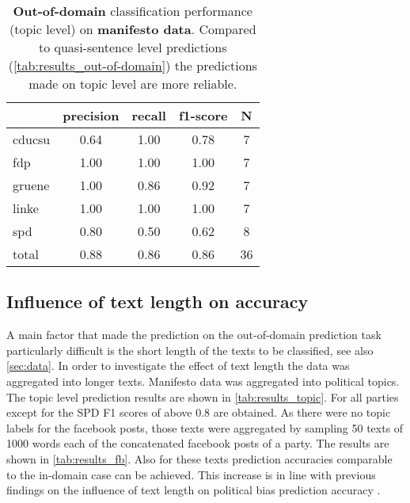 \documentclass[11pt]{article}
\begin{document}
\begin{table}[t]
\caption{
\label{tab:results_topic}
{\bf Out-of-domain} classification performance (topic level) on {\bf manifesto data}. Compared to quasi-sentence level predictions (\autoref{tab:results_out-of-domain}) the predictions made on topic level are more reliable.}
\begin{center}
\begin{tabular}{lcccc}
    &         precision    &recall &  f1-score  & N  \\
    \hline
        \hline
cducsu     &  0.64  &    1.00  &    0.78    &     7\\
       fdp    &   1.00    &  1.00    &  1.00    &     7\\
    gruene  &     1.00  &    0.86  &    0.92    &     7\\
     linke    &   1.00   &   1.00     & 1.00    &     7\\
       spd   &    0.80   &   0.50    &  0.62     &    8\\
    \hline
total  &     0.88   &   0.86   &   0.86  &      36\\
\end{tabular}
\end{center}
\end{table}


\subsection{Influence of text length on accuracy}
A main factor that made the prediction on the out-of-domain prediction task particularly difficult is the short length of the texts to be classified, see also \autoref{sec:data}. In order to investigate the effect of text length the data was aggregated into longer texts. Manifesto data was aggregated into political topics. The topic level prediction results are shown in \autoref{tab:results_topic}. For all parties except for the SPD F1 scores of above 0.8 are obtained. As there were no topic labels for the facebook posts, those texts were aggregated by sampling 50 texts of 1000 words each of the concatenated facebook posts of a party. The results are shown in \autoref{tab:results_fb}. Also for these texts prediction accuracies comparable to the in-domain case can be achieved. This increase is in line with previous findings on the influence of text length on political bias prediction accuracy \cite{Hirst2014}. 
\end{document}
